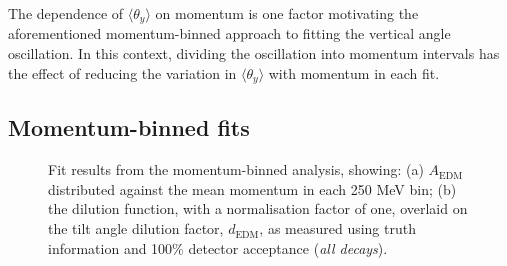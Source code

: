 The dependence of $\langle \theta_{y} \rangle$ on momentum is one factor motivating the aforementioned momentum-binned approach to fitting the vertical angle oscillation. In this context, dividing the oscillation into momentum intervals has the effect of reducing the variation in $\langle \theta_{y} \rangle$ with momentum in each fit.  

\subsection{Momentum-binned fits}\label{subsec:MomentumBinnedAnaSim}

\begin{figure}[b!]
\centering{}
\caption{Fit results from the momentum-binned analysis, showing: (a) $A_{\text{EDM}}$ distributed against the mean momentum in each 250 MeV bin; (b) the dilution function, with a normalisation factor of one, overlaid on the tilt angle dilution factor, $d_{\text{EDM}}$, as measured using truth information and 100\% detector acceptance (\textit{all decays}).}
\label{fig:MomentumBinnedSim}
\end{figure} 

